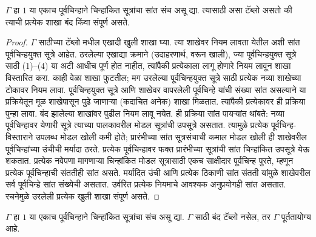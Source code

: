 \begin{prop}\label{nml:tab:cpl:prop:complete-tableau}
  $\Gamma$ हा $1$ या एकाच पूर्वचिन्हाने चिन्हांकित सूत्रांचा
  सांत संच असू द्या. त्यासाठी असा टॅब्लो असतो की
  त्याची प्रत्येक शाखा बंद किंवा संपूर्ण असते.
\end{prop}
\begin{proof}
  $\Gamma$ साठीच्या टॅब्लो मधील
  एखादी खुली शाखा घ्या. त्या शाखेवर नियम
  लावता येतील अशी सांत पूर्वचिन्हयुक्त
  सूत्रे आहेत. ठरलेल्या एखाद्या क्रमाने
  (उदाहरणार्थ, वरून खाली), ज्या
  पूर्वचिन्हयुक्त सूत्रे साठी
  (1)--(4) या अटी आधीच पूर्ण होत नाहीत,
  त्यांपैकी प्रत्येकाला लागू होणारे नियम
  लावून शाखा विस्तारित करा. काही वेळा शाखा
  फुटतील; मग उरलेल्या पूर्वचिन्हयुक्त
  सूत्रे साठी प्रत्येक नव्या शाखेच्या
  टोकावर नियम लावा. पूर्वचिन्हयुक्त
  सूत्रे आणि शाखेवर वापरलेली
  पूर्वचिन्हे यांची संख्या सांत असल्याने
  या प्रक्रियेतून मूळ शाखेपासून पुढे जाणाऱ्या
  (कदाचित अनेक) शाखा मिळतात. त्यांपैकी
  प्रत्येकावर ही प्रक्रिया पुन्हा लावा.
  बंद झालेल्या शाखांवर पुढील नियम लावू नयेत.
  ही प्रक्रिया सांत पायऱ्यांत थांबते: नव्या पूर्वचिन्हावर येणारी
  सूत्रे त्याच्या पालकावरील मोडल सूत्रांची उपसूत्रे असतात.
  त्यामुळे प्रत्येक पूर्वचिन्ह-विस्ताराने उपलब्ध मोडल खोली कमी
  होते; प्रारंभीच्या सांत सूत्रसंचाची कमाल मोडल खोली ही शाखेवरील
  पूर्वचिन्हांच्या उंचीची मर्यादा ठरते. प्रत्येक पूर्वचिन्हावर फक्त
  प्रारंभीच्या सूत्रांची सांत चिन्हांकित उपसूत्रे येऊ शकतात.
  प्रत्येक नवेपणा मागणाऱ्या चिन्हांकित मोडल सूत्रासाठी एकच
  साक्षीदार पूर्वचिन्ह पुरते, म्हणून प्रत्येक पूर्वचिन्हाची संततीही
  सांत असते. मर्यादित उंची आणि प्रत्येक ठिकाणी सांत संतती
  यांमुळे शाखेवरील सर्व पूर्वचिन्हे सांत संख्येची असतात.
  उर्वरित प्रत्येक नियमाचे आवश्यक अनुप्रयोगही सांत असतात.
  रचनेमुळे उरलेली प्रत्येक खुली शाखा संपूर्ण असते.
\end{proof}
\begin{thm}[संपूर्णता]
  \label{nml:tab:cpl:thm:tableau-completeness}
  $\Gamma$ हा $1$ या एकाच पूर्वचिन्हाने चिन्हांकित सूत्रांचा संच असू द्या.
  $\Gamma$ साठी बंद टॅब्लो नसेल,
  तर $\Gamma$ पूर्ततायोग्य आहे.
\end{thm}
